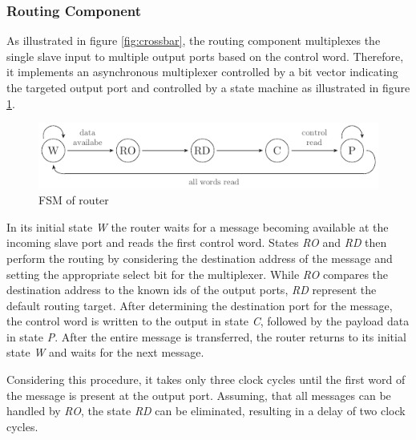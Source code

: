 \subsubsection{Routing Component}
As illustrated in figure \ref{fig:crossbar}, the routing component multiplexes
the single slave input to multiple output ports based on the control word.
Therefore, it implements an asynchronous multiplexer controlled by a bit
vector indicating the targeted output port and controlled by a state machine
as illustrated in figure \ref{fig:router_fsm}.
\begin{figure}[tb]
	\centering
	\includegraphics{../figures/router_fsm}
	\caption{\acs{FSM} of router}
	\label{fig:router_fsm}
\end{figure}
In its initial state \emph{W} the router waits for a message becoming
available at the incoming slave port and reads the first control word. States
\emph{RO} and \emph{RD} then perform the routing by considering the
destination address of the message and setting the appropriate select bit for
the multiplexer. While \emph{RO} compares the destination address to the known
ids of the output ports, \emph{RD} represent the default routing target. After
determining the destination port for the message, the control word is written
to the output in state \emph{C}, followed by the payload data in state
\emph{P}. After the entire message is transferred, the router returns to its
initial state \emph{W} and waits for the next message.

Considering this procedure, it takes only three clock cycles until the first
word of the message is present at the output port. Assuming, that all messages
can be handled by \emph{RO}, the state \emph{RD} can be eliminated, resulting
in a delay of two clock cycles.

